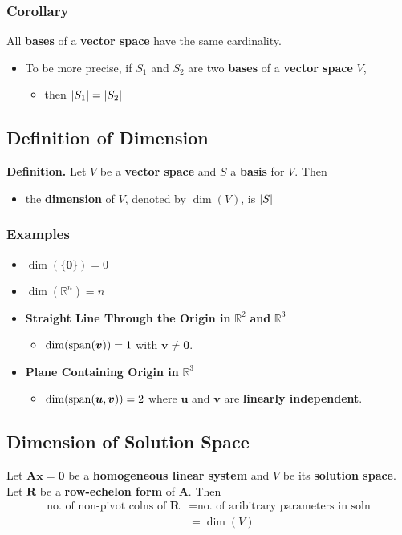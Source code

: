 \documentclass[../ma2001_notes.tex]{subfiles}
\begin{document}
\subsubsection{Corollary}
All \textbf{bases} of a \textbf{vector space} have the same cardinality.
\begin{itemize}
	\item To be more precise, if \(S_1\) and \(S_2\) are two \textbf{bases} of a \textbf{vector space} \(V\),
	\begin{itemize}
		\item then \(\lvert S_1\rvert=\lvert S_2\rvert\)
	\end{itemize}
\end{itemize}

\subsection{Definition of Dimension}
\textbf{Definition.} Let \(V\) be a \textbf{vector space} and \(S\) a \textbf{basis} for \(V\). Then
\begin{itemize}
	\item the \textbf{dimension} of \(V\), denoted by \(\dim(V)\), is \(\lvert S\rvert\)
\end{itemize}

\subsubsection{Examples}
\begin{itemize}
	\item\(\dim(\{\bm{0}\})=0\)
	\item\(\dim(\mathbb{R}^n)=n\)
	\item\textbf{Straight Line Through the Origin in} \(\mathbb{R}^2\) \textbf{and} \(\mathbb{R}^3\)
	\begin{itemize}
		\item\(\dim(\operatorname{span}(\bm{v}))=1\) with \(\bm{v}\ne\bm{0}\).
	\end{itemize}
	\item\textbf{Plane Containing Origin in} \(\mathbb{R}^3\)
	\begin{itemize}
		\item\(\dim(\operatorname{span}(\bm{u},\bm{v}))=2\) where \(\bm{u}\) and \(\bm{v}\) are \textbf{linearly independent}.
	\end{itemize}
\end{itemize}

\subsection{Dimension of Solution Space}
Let \(\bm{Ax}=\bm{0}\) be a \textbf{homogeneous linear system} and \(V\) be its \textbf{solution space}. Let \(\bm{R}\) be a \textbf{row-echelon form} of \(\bm{A}\). Then
\begin{align*}
	\text{no. of non-pivot colns of }\bm{R}
	&=\text{no. of aribitrary parameters in soln} \\
	&=\dim(V)
\end{align*}
\end{document}
